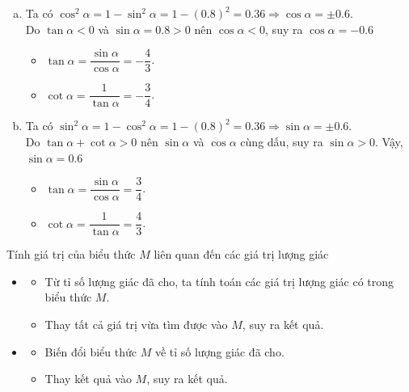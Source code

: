 \begin{vd}
{\begin{enumerate}[a)]
			\item Ta có $\cos^2 \alpha=1-\sin^2\alpha = 1-(0.8)^2=0.36 \Rightarrow \cos \alpha = \pm 0.6$.\\
			Do $\tan \alpha <0$ và $\sin \alpha=0.8>0$ nên $\cos \alpha <0$, suy ra $\cos \alpha = - 0.6$
			\begin{itemize}
				\item  $\tan \alpha = \dfrac{\sin \alpha}{\cos \alpha}=-\dfrac{4}{3}$.
				\item  $\cot \alpha = \dfrac{1}{\tan \alpha}=-\dfrac{3}{4}$.
			\end{itemize} 
			
			\item Ta có $\sin^2 \alpha=1-\cos^2\alpha = 1-(0.8)^2=0.36 \Rightarrow \sin \alpha = \pm 0.6$.\\
			Do $\tan \alpha +\cot \alpha >0$ nên $\sin \alpha$ và $\cos \alpha$ cùng dấu, suy ra $\sin \alpha >0$. Vậy, $\sin \alpha = 0.6$
			\begin{itemize}
				\item  $\tan \alpha = \dfrac{\sin \alpha}{\cos \alpha}=\dfrac{3}{4}$.
				\item  $\cot \alpha = \dfrac{1}{\tan \alpha}=\dfrac{4}{3}$.
			\end{itemize} 
	\end{enumerate}}
\end{vd} 

\begin{dang}{Tính giá trị của biểu thức $M$ liên quan đến các giá trị lượng giác}
	\begin{itemize}
		\item [\iconMT] 
		\begin{itemize}
			\item  Từ tỉ số lượng giác đã cho, ta tính toán các giá trị lượng giác có trong biểu thức $M$.
			\item  Thay tất cả giá trị vừa tìm được vào $M$, suy ra kết quả.
		\end{itemize}
		\item [\iconMT] 
		\begin{itemize}
			\item  Biến đổi biểu thức $M$ về tỉ số lượng giác đã cho.
			\item  Thay kết quả vào $M$, suy ra kết quả.
		\end{itemize}
	\end{itemize}
\end{dang}

